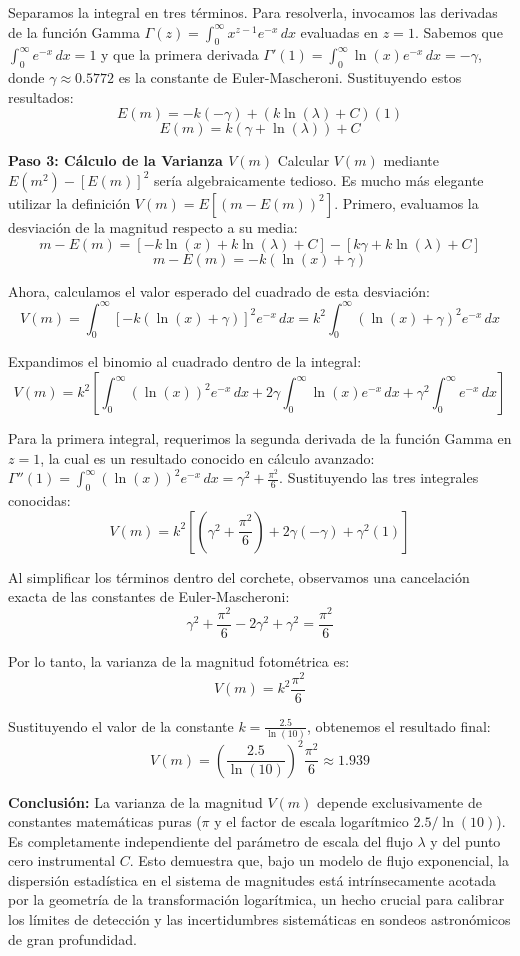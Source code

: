 Separamos la integral en tres términos. Para resolverla, invocamos las derivadas de la función Gamma $\Gamma(z) = \int_{0}^{\infty} x^{z-1} e^{-x} \, dx$ evaluadas en $z=1$. Sabemos que $\int_{0}^{\infty} e^{-x} \, dx = 1$ y que la primera derivada $\Gamma'(1) = \int_{0}^{\infty} \ln(x) e^{-x} \, dx = -\gamma$, donde $\gamma \approx 0.5772$ es la constante de Euler-Mascheroni. Sustituyendo estos resultados:
$$ E(m) = -k(-\gamma) + (k \ln(\lambda) + C)(1) $$
$$ E(m) = k(\gamma + \ln(\lambda)) + C $$

\textbf{Paso 3: Cálculo de la Varianza $V(m)$}
Calcular $V(m)$ mediante $E(m^2) - [E(m)]^2$ sería algebraicamente tedioso. Es mucho más elegante utilizar la definición $V(m) = E[(m - E(m))^2]$. Primero, evaluamos la desviación de la magnitud respecto a su media:
$$ m - E(m) = [-k \ln(x) + k \ln(\lambda) + C] - [k\gamma + k \ln(\lambda) + C] $$
$$ m - E(m) = -k(\ln(x) + \gamma) $$

Ahora, calculamos el valor esperado del cuadrado de esta desviación:
$$ V(m) = \int_{0}^{\infty} [-k(\ln(x) + \gamma)]^2 e^{-x} \, dx = k^2 \int_{0}^{\infty} (\ln(x) + \gamma)^2 e^{-x} \, dx $$

Expandimos el binomio al cuadrado dentro de la integral:
$$ V(m) = k^2 \left[ \int_{0}^{\infty} (\ln(x))^2 e^{-x} \, dx + 2\gamma \int_{0}^{\infty} \ln(x) e^{-x} \, dx + \gamma^2 \int_{0}^{\infty} e^{-x} \, dx \right] $$

Para la primera integral, requerimos la segunda derivada de la función Gamma en $z=1$, la cual es un resultado conocido en cálculo avanzado: $\Gamma''(1) = \int_{0}^{\infty} (\ln(x))^2 e^{-x} \, dx = \gamma^2 + \frac{\pi^2}{6}$. Sustituyendo las tres integrales conocidas:
$$ V(m) = k^2 \left[ \left(\gamma^2 + \frac{\pi^2}{6}\right) + 2\gamma(-\gamma) + \gamma^2(1) \right] $$

Al simplificar los términos dentro del corchete, observamos una cancelación exacta de las constantes de Euler-Mascheroni:
$$ \gamma^2 + \frac{\pi^2}{6} - 2\gamma^2 + \gamma^2 = \frac{\pi^2}{6} $$

Por lo tanto, la varianza de la magnitud fotométrica es:
$$ V(m) = k^2 \frac{\pi^2}{6} $$

Sustituyendo el valor de la constante $k = \frac{2.5}{\ln(10)}$, obtenemos el resultado final:
$$ V(m) = \left( \frac{2.5}{\ln(10)} \right)^2 \frac{\pi^2}{6} \approx 1.939 $$

\textbf{Conclusión:}
La varianza de la magnitud $V(m)$ depende exclusivamente de constantes matemáticas puras ($\pi$ y el factor de escala logarítmico $2.5/\ln(10)$). Es completamente independiente del parámetro de escala del flujo $\lambda$ y del punto cero instrumental $C$. Esto demuestra que, bajo un modelo de flujo exponencial, la dispersión estadística en el sistema de magnitudes está intrínsecamente acotada por la geometría de la transformación logarítmica, un hecho crucial para calibrar los límites de detección y las incertidumbres sistemáticas en sondeos astronómicos de gran profundidad.